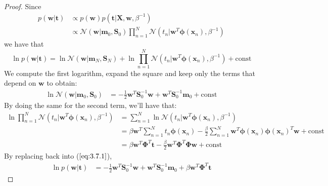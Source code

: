 \vspace{1em}

\begin{proof}
    Since 
    \begin{align*}
        p(\mathbf{w} | \mathbf{t})
        &\propto p(\mathbf{w}) p(\mathbf{t} | \mathbf{X}, \mathbf{w}, \beta^{-1}) \\
        &\propto \mathcal{N}(\mathbf{w} | \mathbf{m}_0, \mathbf{S}_0) 
            \prod_{n=1}^N \mathcal{N}(t_n | \mathbf{w}^T\bm{\phi}(\mathbf{x}_n), \beta^{-1})
    \end{align*}
    we have that
    \begin{equation*}
        \ln p(\mathbf{w} | \mathbf{t})
        = \ln \mathcal{N}(\mathbf{w} | \mathbf{m}_N, \mathbf{S}_N) 
            + \ln \prod_{n=1}^N \mathcal{N}(t_n | \mathbf{w}^T\bm{\phi}(\mathbf{x}_n), \beta^{-1}) 
            + \text{const}
        \tag{3.7.1}\label{eq:3.7.1}
    \end{equation*}
    We compute the first logarithm, expand the square and keep only the terms that depend
    on $\mathbf{w}$ to obtain:
    \begin{align*}
        \ln \mathcal{N}(\mathbf{w} | \mathbf{m}_0, \mathbf{S}_0)
        &= -\frac{1}{2} \mathbf{w}^T \mathbf{S}_0^{-1} \mathbf{w} 
            + \mathbf{w}^T\mathbf{S}_0^{-1}\mathbf{m}_0
            + \text{const}
    \end{align*}
    By doing the same for the second term, we'll have that:
    \begin{align*}
        \ln \prod_{n = 1}^N \mathcal{N}(t_n | \mathbf{w}^T \bm{\phi}(\mathbf{x}_n), \beta^{-1})   
        &= \sum_{n=1}^N \ln \mathcal{N}(t_n | \mathbf{w}^T \bm{\phi}(\mathbf{x}_n), \beta^{-1}) \\
        &= \beta \mathbf{w}^T \sum_{n=1}^N t_n \bm{\phi}(\mathbf{x}_n) 
            - \frac{\beta}{2} \sum_{n=1}^N \mathbf{w}^T \bm{\phi}(\mathbf{x}_n)\bm{\phi}(\mathbf{x}_n)^T \mathbf{w} 
            + \text{const} \\
        &= \beta \mathbf{w}^T \mathbf{\Phi}^T \mathbf{t} 
            - \frac{\beta}{2} \mathbf{w}^T\mathbf{\Phi}^T\mathbf{\Phi}\mathbf{w} + \text{const}
    \end{align*}
    By replacing back into ($\ref{eq:3.7.1}$),
    \begin{align*}
        \ln p(\mathbf{w} | \mathbf{t}) 
        &= -\frac{1}{2} \mathbf{w}^T\mathbf{S}_0^{-1}\mathbf{w} 
            + \mathbf{w}^T\mathbf{S}_0^{-1}\mathbf{m}_0
            +\beta\mathbf{w}^T\mathbf{\Phi}^T\mathbf{t}

\end{align*}
\end{proof}
